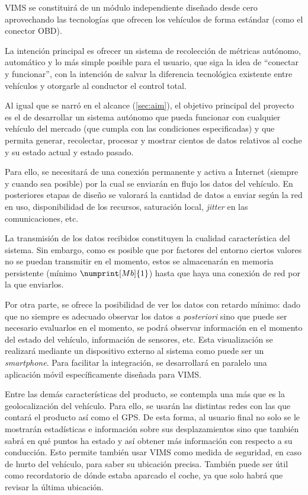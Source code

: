\ac{VIMS} se constituirá de un módulo independiente diseñado desde cero aprovechando
las tecnologías que ofrecen los vehículos de forma estándar (como el conector
\ac{OBD}).

La intención principal es ofrecer un sistema de recolección de métricas autónomo,
automático y lo más simple posible para el usuario, que siga la idea de ``conectar y funcionar'',
con la intención de salvar la diferencia tecnológica existente entre vehículos
y otorgarle al conductor el control total.

Al igual que se narró en el alcance (\ref{sec:aim}), el objetivo principal del proyecto es
el de desarrollar un sistema autónomo que pueda funcionar con cualquier vehículo
del mercado (que cumpla con las condiciones especificadas) y que permita generar,
recolectar, procesar y mostrar cientos de datos relativos al coche y su estado
actual y estado pasado.

Para ello, se necesitará de una conexión permanente y activa a Internet (siempre
y cuando sea posible) por la cual se enviarán en flujo los datos del vehículo.
En posteriores etapas de diseño se valorará la cantidad de datos a enviar según
la red en uso, disponibilidad de los recursos, saturación local, \textit{jitter}
en las comunicaciones, etc.

La transmisión de los datos recibidos constituyen la cualidad característica
del sistema. Sin embargo, como es posible que por factores del entorno ciertos
valores no se puedan transmitir en el momento, estos se almacenarán en memoria
persistente (mínimo $\numprint[Mb]{1}$) hasta que haya una conexión de red
por la que enviarlos.

Por otra parte, se ofrece la posibilidad de ver los datos con retardo mínimo: dado que
no siempre es adecuado observar los datos \textit{a posteriori} sino que puede ser necesario evaluarlos en el momento, se podrá observar información en
el momento del estado del vehículo, información de sensores, etc. Esta
visualización se realizará mediante un dispositivo externo al sistema como
puede ser un \textit{smartphone}. Para facilitar la integración, se desarrollará
en paralelo una aplicación móvil específicamente diseñada para \ac{VIMS}.

Entre las demás características del producto, se contempla una más que es la
geolocalización del vehículo. Para ello, se usarán las distintas redes con
las que contará el producto así como el \ac{GPS}. De esta forma,
al usuario final no solo se le mostrarán estadísticas e información sobre sus
desplazamientos sino que también sabrá en qué puntos ha estado y así obtener más
información con respecto a su conducción. Esto permite también usar \ac{VIMS} como
medida de seguridad, en caso de hurto del vehículo, para saber su ubicación
precisa. También puede ser útil como recordatorio de dónde estaba aparcado el
coche, ya que solo habrá que revisar la última ubicación.

